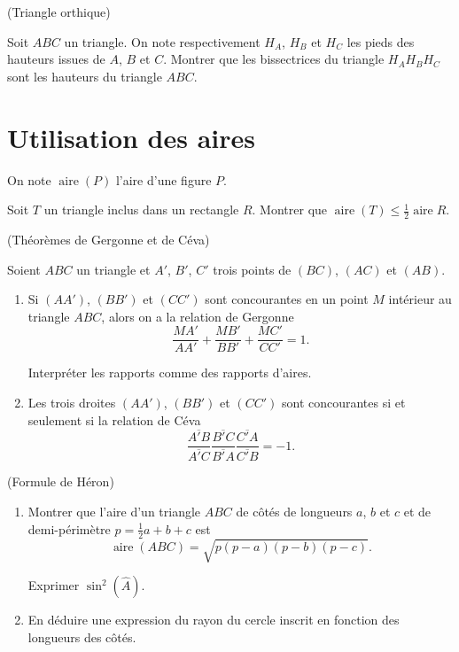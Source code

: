 \documentclass[a4paper,11pt,reqno]{amsart}
\DeclareMathOperator{\aire}{aire}
\begin{document}
\begin{exo} (Triangle orthique)

  Soit $ABC$ un triangle. On note respectivement $H_A$, $H_B$ et $H_C$ les pieds des hauteurs issues de $A$, $B$ et $C$. Montrer que les bissectrices du triangle $H_AH_BH_C$ sont les hauteurs du triangle $ABC$.
\end{exo}


\section{Utilisation des aires}

\begin{convention}
  On note $\aire (P)$ l'aire d'une figure $P$.
\end{convention}

\begin{exo}

  Soit $T$ un triangle inclus dans un rectangle $R$. Montrer que $\aire(T) \leqslant \frac{1}{2}\aire{R}$.
\end{exo}

\begin{exo} (Théorèmes de Gergonne et de Céva)

  Soient $ABC$ un triangle et $A'$, $B'$, $C'$ trois points de $(BC)$, $(AC)$ et $(AB)$.
  \begin{enumerate}
    \item Si $(AA')$, $(BB')$ et $(CC')$ sont concourantes en un point $M$ intérieur au triangle $ABC$, alors on a la relation de Gergonne
    $$
      \frac{MA'}{AA'}+\frac{MB'}{BB'}+\frac{MC'}{CC'}=1.
    $$
    \begin{indication}
      Interpréter les rapports comme des rapports d'aires.
    \end{indication}
    \item Les trois droites $(AA')$, $(BB')$ et $(CC')$ sont concourantes si et seulement si la relation de Céva
      $$
        \frac{\overline{A'B}}{\overline{A'C}}\frac{\overline{B'C}}{\overline{B'A}}\frac{\overline{C'A}}{\overline{C'B}}=-1.
      $$
  \end{enumerate}
\end{exo}

\begin{exo} (Formule de Héron)

  \begin{enumerate}
    \item Montrer que l'aire d'un triangle $ABC$ de côtés de longueurs $a$, $b$ et $c$ et de demi-périmètre $p=\frac{1}{2}{a+b+c}$ est
    $$
      \aire{(ABC)}=\sqrt{p(p-a)(p-b)(p-c)}.
    $$
    \begin{indication}
      Exprimer $\sin^2(\widehat{A})$.
    \end{indication}
    \item En déduire une expression du rayon du cercle inscrit en fonction des longueurs des côtés.
  \end{enumerate}
\end{exo}
\end{document}
